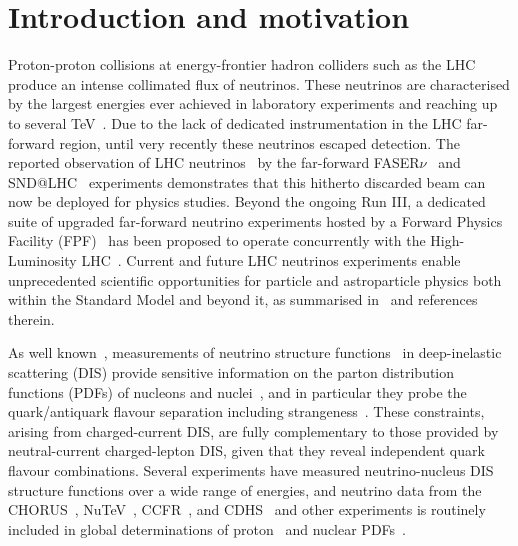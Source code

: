 \section{Introduction and motivation}
\label{sec:introduction}

Proton-proton collisions at energy-frontier hadron colliders
such as the LHC produce an intense collimated flux of neutrinos.
%
These neutrinos are characterised by the largest energies ever achieved in laboratory experiments and
reaching up to several TeV~\cite{Kling:2021gos}.
%
Due to the lack of dedicated instrumentation in the LHC far-forward region,
until very recently these neutrinos escaped detection.
%
The reported observation of LHC neutrinos~\cite{FASER:2023zcr,SNDLHC:2023pun} by the
far-forward  FASER$\nu$~\cite{FASER:2019dxq} and SND@LHC~\cite{SHiP:2020sos,SNDLHC:2022ihg} experiments
demonstrates that this hitherto discarded beam can now be deployed for physics studies.
%
Beyond the ongoing Run III, a dedicated suite of upgraded far-forward
neutrino experiments hosted by a
Forward Physics Facility (FPF)~\cite{Anchordoqui:2021ghd,Feng:2022inv} has been
proposed to operate concurrently with the High-Luminosity LHC~\cite{Azzi:2019yne,Cepeda:2019klc}.
%
Current and future 
LHC neutrinos experiments enable
unprecedented scientific opportunities
for particle and astroparticle physics both within the Standard Model and beyond it,
as summarised in~\cite{Anchordoqui:2021ghd,Feng:2022inv}
and references therein.

As well known~\cite{Conrad:1997ne,Mangano:2001mj},
measurements of neutrino structure functions~\cite{Candido:2023utz} in deep-inelastic scattering
(DIS) provide sensitive information on the parton distribution functions (PDFs)
of nucleons and nuclei~\cite{Ethier:2020way,Gao:2017yyd,Kovarik:2019xvh}, and in particular
they probe the quark/antiquark  flavour separation including
strangeness~\cite{NuTeV:2007uwm,CCFR:1994ikl,Faura:2020oom,NOMAD:2013hbk}.
%
These constraints, arising from charged-current DIS, are fully complementary to those
provided by neutral-current charged-lepton DIS, given that they reveal independent
quark flavour combinations.
%
Several  experiments have measured neutrino-nucleus
DIS structure functions over a wide range of energies, and neutrino data
from the CHORUS~\cite{CHORUS:2005cpn}, NuTeV~\cite{NuTeV:2001dfo},
CCFR~\cite{Yang:2000ju}, and CDHS~\cite{Berge:1989hr}
and other experiments is routinely  included in global
determinations of proton~\cite{NNPDF:2021njg,Hou:2019efy,Bailey:2020ooq} and nuclear
PDFs~\cite{Eskola:2021nhw,AbdulKhalek:2022fyi,Muzakka:2022wey}.

